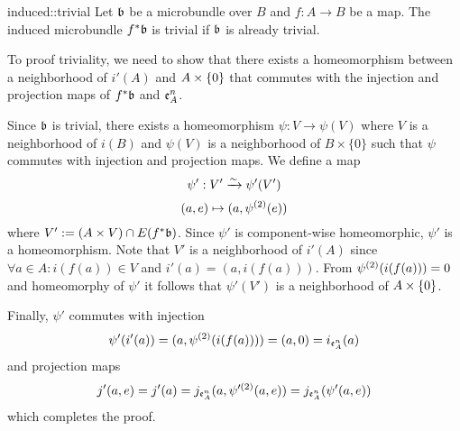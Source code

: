 \begin{mylemma}{induced::trivial}
    Let $\mathfrak{b}$ be a microbundle over $B$ and $f: A \to B$ be a map.
    The induced microbundle $f^*\mathfrak{b}$ is trivial if $\mathfrak{b}$ is already trivial.
\end{mylemma}

\begin{myproof}
    To proof triviality, we need to show that there exists a homeomorphism between a neighborhood of $i'(A)$ and $A \times{} \{0\}$
    that commutes with the injection and projection maps of $f^*\mathfrak{b}$ and $\mathfrak{e}^{n}_{A}$.
    
    Since $\mathfrak{b}$ is trivial, there exists a homeomorphism $\psi: V \to \psi(V)$
    where $V$ is a neighborhood of $i(B)$ and $\psi(V)$ is a neighborhood of $B \times \{0\}$
    such that $\psi$ commutes with injection and projection maps.
    We define a map 
    \[ \psi': V' \xrightarrow{\sim} \psi'(V') \]
    \[ (a, e) \mapsto (a, \psi^{(2)}(e)) \]
    where $V' := (A \times V) \cap E(f^*\mathfrak{b})$.
    Since $\psi'$ is component-wise homeomorphic, $\psi'$ is a homeomorphism.
    Note that $V'$ is a neighborhood of $i'(A)$ since $\forall a \in A: i(f(a)) \in V$ and $i'(a) = (a, i(f(a)))$.
    From $\psi^{(2)}(i(f(a))) = 0$ and homeomorphy of $\psi'$ it follows that $\psi'(V')$ is a neighborhood of $A \times{} \{0\}$.

    Finally, $\psi'$ commutes with injection
    \[ \psi'(i'(a)) = (a, \psi^{(2)}(i(f(a)))) = (a, 0) = i_{\mathfrak{e}^{n}_{A}}(a) \]
    and projection maps
    \[ j'(a, e) = j'(a) = j_{\mathfrak{e}^{n}_{A}}(a, \psi'^{(2)}(a, e)) = j_{\mathfrak{e}^{n}_{A}}(\psi'(a, e)) \]
    which completes the proof.
\end{myproof}